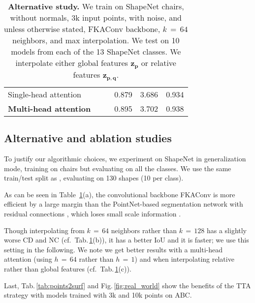\documentclass[10pt,twocolumn,letterpaper]{article}
\newcommand{\latentv}{{\mathbf{z}}}
\newcommand{\point}{{\mathbf{p}}}
\newcommand{\qpoint}{{\mathbf{q}}}
\newcommand{\tabfirst}{\cellcolor{blue!25}}
\newcommand{\tabsecond}{\cellcolor{blue!10}}
\begin{document}
\begin{table}[t]
\begin{tabular}{l@{~}c@{~~}c@{~~}|ccc}
        Single-head attention	    & & \checkmark & 0.879 & \tabfirst 3.686	& 0.934	\\ 
        \bf Multi-head attention 	& & \checkmark & \tabfirst 0.895 & \tabsecond 3.702	& \tabfirst 0.938	\\
\bottomrule
\end{tabular}
\vspace{-2mm}
\caption{\textbf{Alternative study.} We train on ShapeNet chairs, without normals, 3k input points, with noise, and unless otherwise stated, FKAConv backbone, $k\,{=}\, 64$ neighbors, and max interpolation. We test on 10 models from each of the 13 ShapeNet classes. We interpolate either global features $\latentv_{\point}$ or relative features $\latentv_{\point,\qpoint}$.}
\label{tab:ablations}
\vspace{-2mm}
\end{table}

\subsection{Alternative and ablation studies}

To justify our algorithmic choices, we experiment on ShapeNet in generalization mode, training on chairs but evaluating on all the classes. We use the same train/test split as \cite{Mescheder2019CVPR, Peng2020ECCV}, evaluating on 130 shapes (10 per class).

As can be seen in Table~\ref{tab:ablations}(a), the convolutional backbone FKAConv \cite{Boulch2020ACCV} is more efficient by a large margin than the PointNet-based segmentation network with residual connections \cite{Qi2017CVPR, Mescheder2019CVPR}, which loses small scale information \cite{Qi2017NIPS}. 

Though interpolating from $k\,{=}\,64$ neighbors rather than $k\,{=}\,128$ has a slightly worse CD and NC (cf.\ Tab.\,\ref{tab:ablations}(b)), it has a better IoU and it is faster; we use this setting in the following. We note we get better results with a multi-head attention (using $h\,{=}\,64$ rather than $h\,{=}\,1$) and when interpolating relative rather than global features (cf.\ Tab.\,\ref{tab:ablations}(c)).

Last, Tab.\,\ref{tab:points2surf} and Fig.\,\ref{fig:real_world} show the benefits of the TTA strategy with models trained with 3k and 10k points on ABC.
\end{document}
